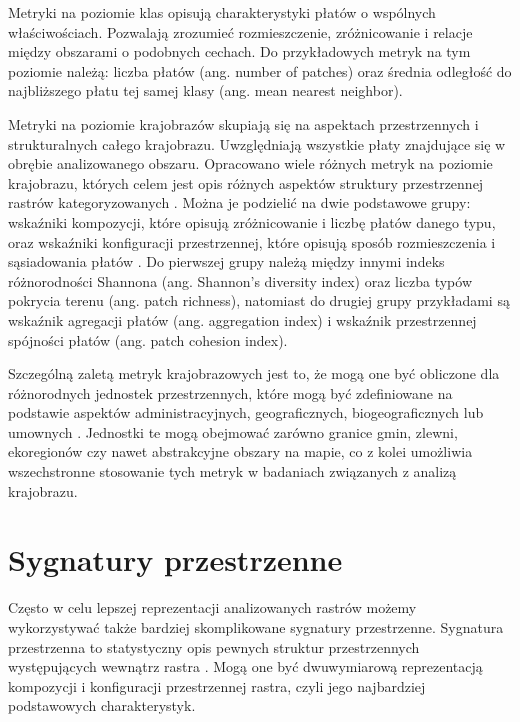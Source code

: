 \documentclass{amuthesis}
\begin{document}
Metryki na poziomie klas opisują charakterystyki płatów o wspólnych
właściwościach. Pozwalają zrozumieć rozmieszczenie, zróżnicowanie i
relacje między obszarami o podobnych cechach. Do przykładowych metryk na
tym poziomie należą: liczba płatów (ang. number of patches) oraz średnia
odległość do najbliższego płatu tej samej klasy (ang. mean nearest
neighbor).

Metryki na poziomie krajobrazów skupiają się na aspektach przestrzennych
i strukturalnych całego krajobrazu. Uwzględniają wszystkie płaty
znajdujące się w obrębie analizowanego obszaru. Opracowano wiele różnych
metryk na poziomie krajobrazu, których celem jest opis różnych aspektów
struktury przestrzennej rastrów kategoryzowanych
\autocite{McGarigal_fragstats}. Można je podzielić na dwie podstawowe
grupy: wskaźniki kompozycji, które opisują zróżnicowanie i liczbę płatów
danego typu, oraz wskaźniki konfiguracji przestrzennej, które opisują
sposób rozmieszczenia i sąsiadowania płatów
\autocite{solon2002,kozak2014}. Do pierwszej grupy należą między innymi
indeks różnorodności Shannona (ang. Shannon's diversity index) oraz
liczba typów pokrycia terenu (ang. patch richness), natomiast do drugiej
grupy przykładami są wskaźnik agregacji płatów (ang. aggregation index)
i wskaźnik przestrzennej spójności płatów (ang. patch cohesion index).

Szczególną zaletą metryk krajobrazowych jest to, że mogą one być
obliczone dla różnorodnych jednostek przestrzennych, które mogą być
zdefiniowane na podstawie aspektów administracyjnych, geograficznych,
biogeograficznych lub umownych \autocite{Pukowiec_Kurda_Sobala_2016}.
Jednostki te mogą obejmować zarówno granice gmin, zlewni, ekoregionów
czy nawet abstrakcyjne obszary na mapie, co z kolei umożliwia
wszechstronne stosowanie tych metryk w badaniach związanych z analizą
krajobrazu.

\hypertarget{sygnatury-przestrzenne}{%
\section{Sygnatury przestrzenne}\label{sygnatury-przestrzenne}}

Często w celu lepszej reprezentacji analizowanych rastrów możemy
wykorzystywać także bardziej skomplikowane sygnatury przestrzenne.
Sygnatura przestrzenna to statystyczny opis pewnych struktur
przestrzennych występujących wewnątrz rastra
\autocite{Jasiewicz_GeoPAT,nowosad_motif}. Mogą one być dwuwymiarową
reprezentacją kompozycji i konfiguracji przestrzennej rastra, czyli jego
najbardziej podstawowych charakterystyk.
\end{document}
